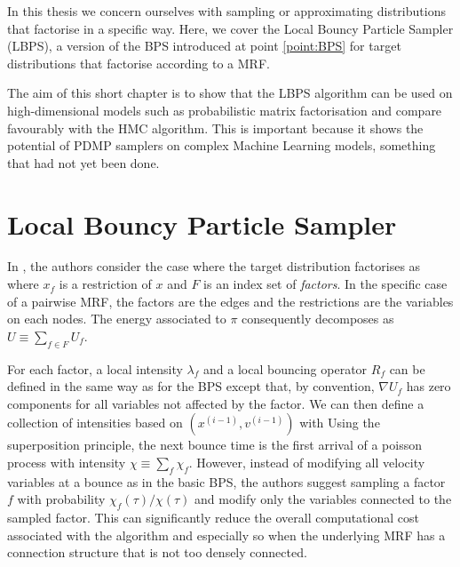 
In this thesis we concern ourselves with sampling or approximating distributions that factorise in a specific way. Here, we cover the Local Bouncy Particle Sampler (LBPS), a version of the BPS introduced at point \ref{point:BPS} for target distributions that factorise according to a MRF.

The aim of this short chapter is to show that the LBPS algorithm can be used on high-dimensional models such as probabilistic matrix factorisation and compare favourably with the HMC algorithm. This is important because it shows the potential of PDMP samplers on complex Machine Learning models, something that had not yet been done.

\section{Local Bouncy Particle Sampler}
In \cite{bouchard15}, the authors consider the case where the target distribution factorises as
%
%
where $x_{f}$ is a restriction of $x$ and $F$ is an index set of \emph{factors}. In the specific case of a pairwise MRF, the factors are the edges and the restrictions are the variables on each nodes. The energy associated to $\pi$ consequently decomposes as $U\equiv \sum_{f\in F}U_{f}$.

For each factor, a local intensity $\lambda_{f}$ and a local bouncing operator $R_{f}$ can be defined in the same way as for the BPS except that, by convention, $\nabla U_{f}$ has zero components for all variables not affected by the factor. We can then define a collection of intensities based on $(x^{(i-1)},v^{(i-1)})$ with
%
%
Using the superposition principle, the next bounce time is the first arrival of a poisson process with intensity $\chi\equiv\sum_{f} \chi_{f}$. However, instead of modifying all velocity variables at a bounce as in the basic BPS, the authors suggest sampling a factor $f$ with probability $\chi_{f}(\tau)/\chi(\tau)$ and modify only the variables connected to the sampled factor. This can significantly reduce the overall computational cost associated with the algorithm and especially so when the underlying MRF has a connection structure that is not too densely connected.

